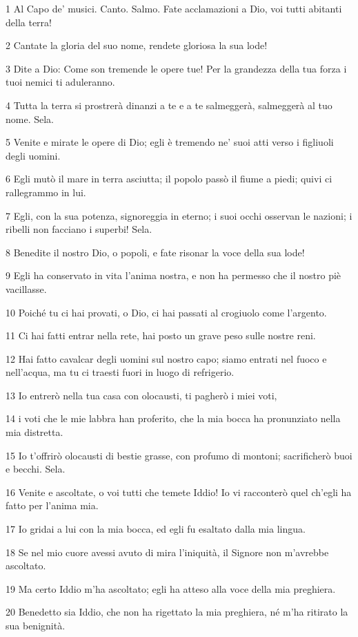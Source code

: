 \par 1 Al Capo de' musici. Canto. Salmo. Fate acclamazioni a Dio, voi tutti abitanti della terra!
\par 2 Cantate la gloria del suo nome, rendete gloriosa la sua lode!
\par 3 Dite a Dio: Come son tremende le opere tue! Per la grandezza della tua forza i tuoi nemici ti aduleranno.
\par 4 Tutta la terra si prostrerà dinanzi a te e a te salmeggerà, salmeggerà al tuo nome. Sela.
\par 5 Venite e mirate le opere di Dio; egli è tremendo ne' suoi atti verso i figliuoli degli uomini.
\par 6 Egli mutò il mare in terra asciutta; il popolo passò il fiume a piedi; quivi ci rallegrammo in lui.
\par 7 Egli, con la sua potenza, signoreggia in eterno; i suoi occhi osservan le nazioni; i ribelli non facciano i superbi! Sela.
\par 8 Benedite il nostro Dio, o popoli, e fate risonar la voce della sua lode!
\par 9 Egli ha conservato in vita l'anima nostra, e non ha permesso che il nostro piè vacillasse.
\par 10 Poiché tu ci hai provati, o Dio, ci hai passati al crogiuolo come l'argento.
\par 11 Ci hai fatti entrar nella rete, hai posto un grave peso sulle nostre reni.
\par 12 Hai fatto cavalcar degli uomini sul nostro capo; siamo entrati nel fuoco e nell'acqua, ma tu ci traesti fuori in luogo di refrigerio.
\par 13 Io entrerò nella tua casa con olocausti, ti pagherò i miei voti,
\par 14 i voti che le mie labbra han proferito, che la mia bocca ha pronunziato nella mia distretta.
\par 15 Io t'offrirò olocausti di bestie grasse, con profumo di montoni; sacrificherò buoi e becchi. Sela.
\par 16 Venite e ascoltate, o voi tutti che temete Iddio! Io vi racconterò quel ch'egli ha fatto per l'anima mia.
\par 17 Io gridai a lui con la mia bocca, ed egli fu esaltato dalla mia lingua.
\par 18 Se nel mio cuore avessi avuto di mira l'iniquità, il Signore non m'avrebbe ascoltato.
\par 19 Ma certo Iddio m'ha ascoltato; egli ha atteso alla voce della mia preghiera.
\par 20 Benedetto sia Iddio, che non ha rigettato la mia preghiera, né m'ha ritirato la sua benignità.

